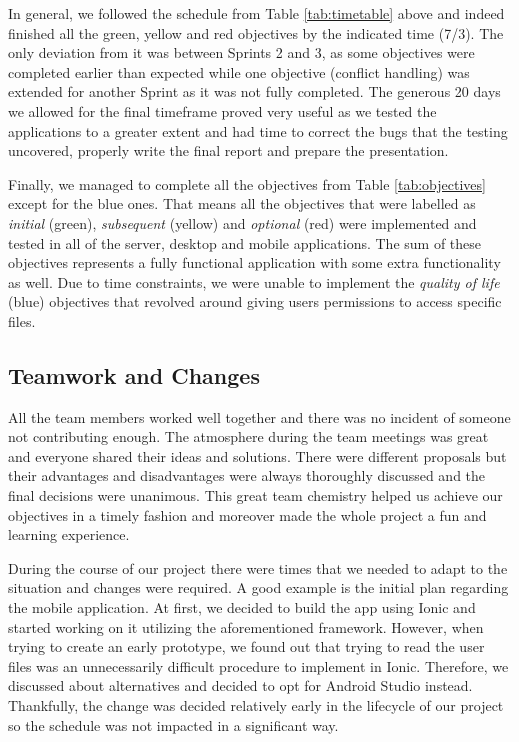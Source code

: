 \documentclass[11pt]{article}
\begin{document}
In general, we followed the schedule from Table \ref{tab:timetable} above and indeed finished all the green, yellow and red objectives by the indicated time (7/3). The only deviation from it was between Sprints 2 and 3, as some objectives were completed earlier than expected while one objective (conflict handling) was extended for another Sprint as it was not fully completed. The generous 20 days we allowed for the final timeframe proved very useful as we tested the applications to a greater extent and had time to correct the bugs that the testing uncovered, properly write the final report and prepare the presentation.

Finally, we managed to complete all the objectives from Table \ref{tab:objectives} except for the blue ones. That means all the objectives that were labelled as \emph{initial} (green), \emph{subsequent} (yellow) and \emph{optional} (red) were implemented and tested in all of the server, desktop and mobile applications. The sum of these objectives represents a fully functional application with some extra functionality as well. Due to time constraints, we were unable to implement the \emph{quality of life} (blue) objectives that revolved around giving users permissions to access specific files.

\subsection{Teamwork and Changes}

All the team members worked well together and there was no incident of someone not contributing enough. The atmosphere during the team meetings was great and everyone shared their ideas and solutions. There were different proposals but their advantages and disadvantages were always thoroughly discussed and the final decisions were unanimous. This great team chemistry helped us achieve our objectives in a timely fashion and moreover made the whole project a fun and learning experience.

During the course of our project there were times that we needed to adapt to the situation and changes were required. A good example is the initial plan regarding the mobile application. At first, we decided to build the app using Ionic \cite{ionic:19} and started working on it utilizing the aforementioned framework. However, when trying to create an early prototype, we found out that trying to read the user files was an unnecessarily difficult procedure to implement in Ionic. Therefore, we discussed about alternatives and decided to opt for Android Studio instead. Thankfully, the change was decided relatively early in the lifecycle of our project so the schedule was not impacted in a significant way.
\end{document}
